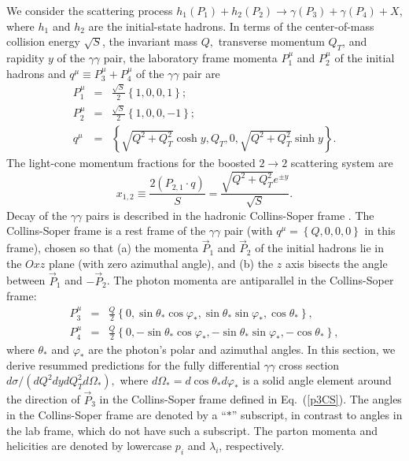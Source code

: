 \documentclass[12pt,english,aps,preprint,prd,letterpaper,fleqn,nofootinbib,showpacs,showkeys,tightenlines,floatfix]{revtex4}
\begin{document}
We consider the scattering process $h_{1}(P_{1})+h_{2}(P_{2})\rightarrow\gamma(P_{3})+\gamma(P_{4})+X$,
where $h_{1}$ and $h_{2}$ are the initial-state hadrons. In terms of the center-of-mass 
collision energy $\sqrt{S}$, the invariant mass $Q,$ transverse momentum $Q_{T}$, and 
rapidity $y$ of the $\gamma\gamma$ pair, the laboratory frame momenta $P_{1}^{\mu}$ and $P_{2}^{\mu}$ 
of the initial hadrons and $q^{\mu}\equiv P_{3}^{\mu}+P_{4}^{\mu}$ of
the $\gamma\gamma$ pair are \begin{eqnarray}
P_{1}^{\mu} & = & \frac{\sqrt{S}}{2}\left\{ 1,0,0,1\right\} ;\\
P_{2}^{\mu} & = & \frac{\sqrt{S}}{2}\left\{ 1,0,0,-1\right\} ;\\
q^{\mu} & = & \left\{ \sqrt{Q^{2}+Q_{T}^{2}}\cosh y,Q_{T},0,\sqrt{Q^{2}+Q_{T}^{2}}\sinh y\right\}. \end{eqnarray}
The light-cone momentum fractions for the boosted $2\rightarrow2$
scattering system are\begin{equation}
x_{1,2}\equiv\frac{2(P_{2,1}\cdot q)}{S}=\frac{\sqrt{Q^{2}+Q_{T}^{2}}e^{\pm y}}{\sqrt{S}}.\end{equation}
 Decay of the $\gamma\gamma$ pairs is described in the hadronic Collins-Soper
frame \cite{Collins:1977iv}. The Collins-Soper frame is a rest frame
of the $\gamma\gamma$ pair (with $q^{\mu}=\left\{ Q,0,0,0\right\} $
in this frame), chosen so that (a) the momenta $\vec{P}_{1}$ and
$\vec{P}_{2}$ of the initial hadrons lie in the $Oxz$ plane (with
zero azimuthal angle), and (b) the $z$ axis bisects the angle between
$\vec{P}_{1}$ and $-\vec{P}_{2}$. The photon momenta are antiparallel
in the Collins-Soper frame: \begin{eqnarray}
P_{3}^{\mu} & = & \frac{Q}{2}\left\{ 0,\sin\theta_{*}\cos\varphi_{*},\sin\theta_{*}\sin\varphi_{*},\cos\theta_{*}\right\} ,\label{p3CS}\\
P_{4}^{\mu} & = & \frac{Q}{2}\left\{ 0,-\sin\theta_{*}\cos\varphi_{*},-\sin\theta_{*}\sin\varphi_{*},-\cos\theta_{*}\right\} ,\label{p4CS}\end{eqnarray}
 where $\theta_{*}$ and $\varphi_{*}$ are the photon's polar
and azimuthal angles. In this section, we derive resummed predictions
for the fully differential $\gamma\gamma$ cross section $d\sigma/(dQ^{2}dydQ_{T}^{2}d\Omega_{*}),$
where $d\Omega_{*}=d\cos\theta_{*}d\varphi_{*}$ is a
solid angle element around the direction of $\vec{P}_{3}$ in the
Collins-Soper frame defined in Eq.~(\ref{p3CS}). The angles in the
Collins-Soper frame are denoted by a {}``$*$'' subscript, in
contrast to angles in the lab frame, which do not have such a subscript.
The parton momenta and helicities are denoted by lowercase $p_{i}$
and $\lambda_{i}$, respectively.
\end{document}
